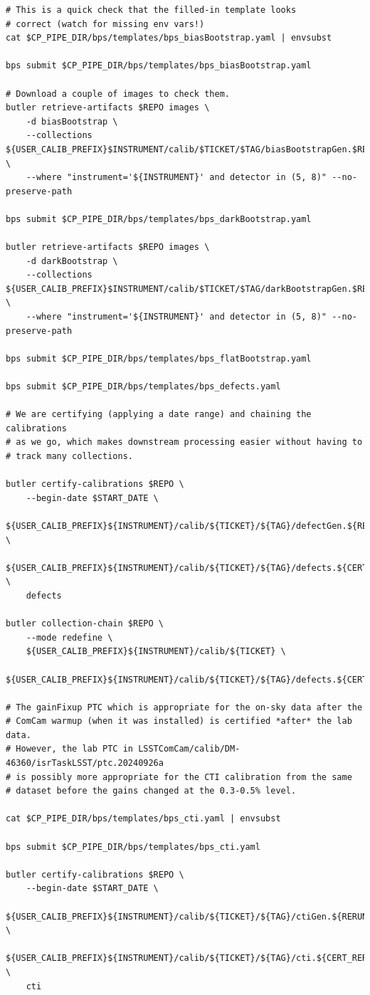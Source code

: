\documentclass[DM,authoryear,toc]{lsstdoc}
\begin{document}
\begin{verbatim}
# This is a quick check that the filled-in template looks
# correct (watch for missing env vars!)
cat $CP_PIPE_DIR/bps/templates/bps_biasBootstrap.yaml | envsubst

bps submit $CP_PIPE_DIR/bps/templates/bps_biasBootstrap.yaml

# Download a couple of images to check them.
butler retrieve-artifacts $REPO images \
    -d biasBootstrap \
    --collections ${USER_CALIB_PREFIX}$INSTRUMENT/calib/$TICKET/$TAG/biasBootstrapGen.$RERUN/run${BOOTSTRAP_RUN_NUMBER} \
    --where "instrument='${INSTRUMENT}' and detector in (5, 8)" --no-preserve-path

bps submit $CP_PIPE_DIR/bps/templates/bps_darkBootstrap.yaml

butler retrieve-artifacts $REPO images \
    -d darkBootstrap \
    --collections ${USER_CALIB_PREFIX}$INSTRUMENT/calib/$TICKET/$TAG/darkBootstrapGen.$RERUN/run${BOOTSTRAP_RUN_NUMBER} \
    --where "instrument='${INSTRUMENT}' and detector in (5, 8)" --no-preserve-path

bps submit $CP_PIPE_DIR/bps/templates/bps_flatBootstrap.yaml

bps submit $CP_PIPE_DIR/bps/templates/bps_defects.yaml

# We are certifying (applying a date range) and chaining the calibrations
# as we go, which makes downstream processing easier without having to
# track many collections.

butler certify-calibrations $REPO \
    --begin-date $START_DATE \
    ${USER_CALIB_PREFIX}${INSTRUMENT}/calib/${TICKET}/${TAG}/defectGen.${RERUN} \
    ${USER_CALIB_PREFIX}${INSTRUMENT}/calib/${TICKET}/${TAG}/defects.${CERT_RERUN} \
    defects

butler collection-chain $REPO \
    --mode redefine \
    ${USER_CALIB_PREFIX}${INSTRUMENT}/calib/${TICKET} \
    ${USER_CALIB_PREFIX}${INSTRUMENT}/calib/${TICKET}/${TAG}/defects.${CERT_RERUN}

# The gainFixup PTC which is appropriate for the on-sky data after the
# ComCam warmup (when it was installed) is certified *after* the lab data.
# However, the lab PTC in LSSTComCam/calib/DM-46360/isrTaskLSST/ptc.20240926a
# is possibly more appropriate for the CTI calibration from the same
# dataset before the gains changed at the 0.3-0.5% level.

cat $CP_PIPE_DIR/bps/templates/bps_cti.yaml | envsubst

bps submit $CP_PIPE_DIR/bps/templates/bps_cti.yaml

butler certify-calibrations $REPO \
    --begin-date $START_DATE \
    ${USER_CALIB_PREFIX}${INSTRUMENT}/calib/${TICKET}/${TAG}/ctiGen.${RERUN} \
    ${USER_CALIB_PREFIX}${INSTRUMENT}/calib/${TICKET}/${TAG}/cti.${CERT_RERUN} \
    cti


\end{verbatim}
\end{document}
